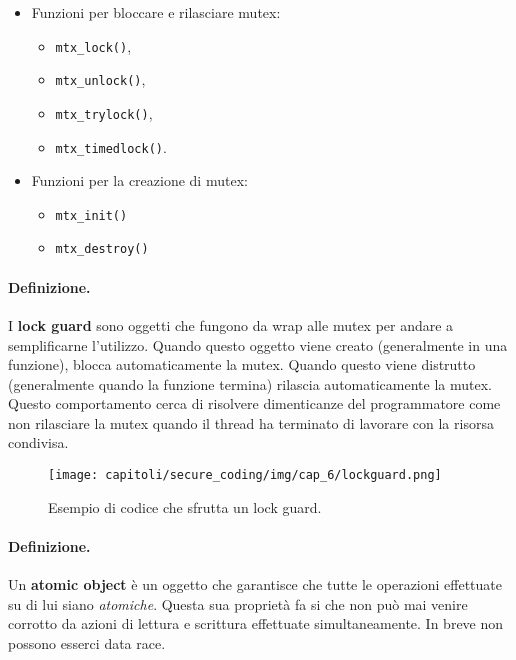 \begin{itemize}
    \item Funzioni per bloccare e rilasciare mutex:
          \begin{itemize}
              \item \verb|mtx_lock()|,
              \item \verb|mtx_unlock()|,
              \item \verb|mtx_trylock()|,
              \item \verb|mtx_timedlock()|.
          \end{itemize}
    \item Funzioni per la creazione di mutex:
          \begin{itemize}
              \item \verb|mtx_init()|
              \item \verb|mtx_destroy()|
          \end{itemize}
\end{itemize}

\paragraph{Definizione.}
I \textbf{lock guard} sono oggetti che fungono da wrap alle mutex per andare a
semplificarne l'utilizzo. Quando questo oggetto viene creato (generalmente in una
funzione), blocca automaticamente la mutex. Quando questo viene distrutto (generalmente
quando la funzione termina) rilascia automaticamente la mutex. Questo comportamento
cerca di risolvere dimenticanze del programmatore come non rilasciare la mutex quando
il thread ha terminato di lavorare con la risorsa condivisa.

\begin{figure}[H]
    \centering
    \texttt{[image: capitoli/secure\_coding/img/cap\_6/lockguard.png]}
    \caption{Esempio di codice che sfrutta un lock guard.}
\end{figure}

\paragraph{Definizione.}
Un \textbf{atomic object} è un oggetto che garantisce che tutte le operazioni effettuate su di lui
siano \textit{atomiche}. Questa sua proprietà fa si che non può mai venire corrotto da azioni di
lettura e scrittura effettuate simultaneamente. In breve non possono esserci data race.

